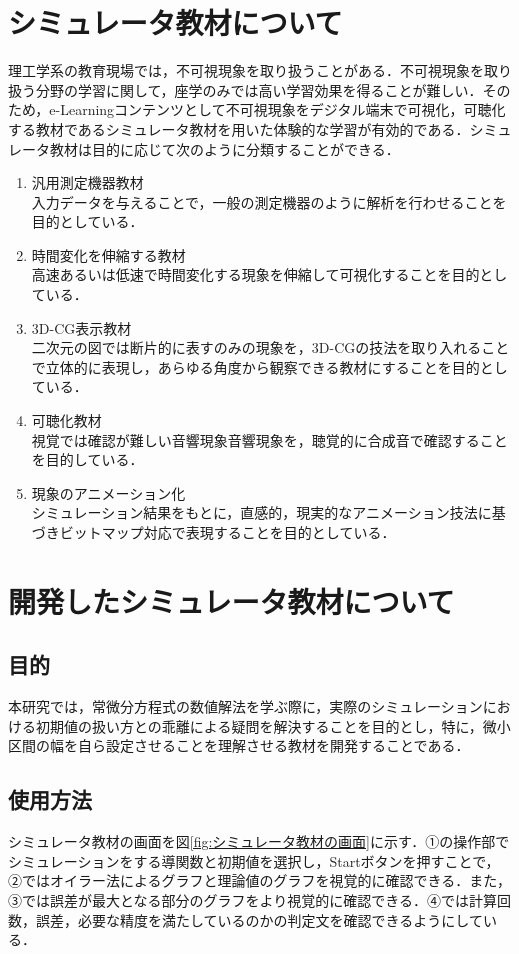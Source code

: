 \documentclass[a4paper, 12pt]{ltjsarticle}
\begin{document}
\section{シミュレータ教材について}
理工学系の教育現場では，不可視現象を取り扱うことがある．不可視現象を取り扱う分野の学習に関して，座学のみでは高い学習効果を得ることが難しい．そのため，e-Learningコンテンツとして不可視現象をデジタル端末で可視化，可聴化する教材であるシミュレータ教材を用いた体験的な学習が有効的である．シミュレータ教材は目的に応じて次のように分類することができる．
\begin{enumerate}[label=(\alph*)]
\item 汎用測定機器教材\\
入力データを与えることで，一般の測定機器のように解析を行わせることを目的としている．
\item 時間変化を伸縮する教材\\
高速あるいは低速で時間変化する現象を伸縮して可視化することを目的としている．
\item 3D-CG表示教材\\
二次元の図では断片的に表すのみの現象を，3D-CGの技法を取り入れることで立体的に表現し，あらゆる角度から観察できる教材にすることを目的としている．
\item 可聴化教材\\
視覚では確認が難しい音響現象音響現象を，聴覚的に合成音で確認することを目的している．
\item 現象のアニメーション化\\
シミュレーション結果をもとに，直感的，現実的なアニメーション技法に基づきビットマップ対応で表現することを目的としている．
\end{enumerate}
\clearpage
\section{開発したシミュレータ教材について}
\subsection{目的}
本研究では，常微分方程式の数値解法を学ぶ際に，実際のシミュレーションにおける初期値の扱い方との乖離による疑問を解決することを目的とし，特に，微小区間の幅を自ら設定させることを理解させる教材を開発することである．
\subsection{使用方法}
シミュレータ教材の画面を図\ref{fig:シミュレータ教材の画面}に示す．①の操作部でシミュレーションをする導関数と初期値を選択し，Startボタンを押すことで，②ではオイラー法によるグラフと理論値のグラフを視覚的に確認できる．また，③では誤差が最大となる部分のグラフをより視覚的に確認できる．④では計算回数，誤差，必要な精度を満たしているのかの判定文を確認できるようにしている．
\end{document}
